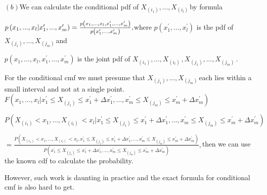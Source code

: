 \documentclass{article}
\begin{document}
$\left( b\right) $We can calculate the conditional pdf of $X_{\left(
i_{1}\right) },...,X_{\left( i_{l}\right) \ }$by formula

$p\left( x_{1},...,x_{l}|x_{1}^{\prime },...,x_{m}^{\prime }\right) =\frac{%
p\left( x_{1},...,x_{l},x_{1}^{\prime },...,x_{m}^{\prime }\right) }{p\left(
x_{1}^{\prime },...,x_{m}^{\prime }\right) },$where $p\left( x_{1}^{\prime
},...,x_{l}^{\prime }\right) $ is the pdf of $X_{\left( j_{1}\right)
},...,X_{\left( j_{m}\right) \ }$and

$p\left( x_{1},...,x_{l},x_{1}^{\prime },...,x_{m}^{\prime }\right) $ is the
joint pdf of $X_{\left( i_{1}\right) },...,X_{\left( i_{l}\right) \
},X_{\left( j_{1}\right) },...,X_{\left( j_{m}\right) \ }.$

For the conditional cmf we must presume that $X_{\left( j_{1}\right)
},...,X_{\left( j_{m}\right) \ }$each lies within a small interval and not
at a single point. $F\left( x_{1},...,x_{l}|x_{1}^{\prime }\leq X_{\left(
j_{1}\right) }\leq x_{1}^{\prime }+\Delta x_{1}^{\prime },...,x_{m}^{\prime
}\leq X_{\left( j_{m}\right) }\leq x_{m}^{\prime }+\Delta x_{m}^{\prime
}\right) $

$P\left( X_{\left( i_{1}\right) }<x_{1},...,X_{\left( i_{l}\right) \
}<x_{l}|x_{1}^{\prime }\leq X_{\left( j_{1}\right) }\leq x_{1}^{\prime
}+\Delta x_{1}^{\prime },...,x_{m}^{\prime }\leq X_{\left( j_{m}\right)
}\leq x_{m}^{\prime }+\Delta x_{m}^{\prime }\right) $

$=\frac{P\left( X_{\left( i_{1}\right) }<x_{1},...,X_{\left( i_{l}\right) \
}<x_{l},x_{1}^{\prime }\leq X_{\left( j_{1}\right) }\leq x_{1}^{\prime
}+\Delta x_{1}^{\prime },...,x_{m}^{\prime }\leq X_{\left( j_{m}\right)
}\leq x_{m}^{\prime }+\Delta x_{m}^{\prime }\right) }{P\left( x_{1}^{\prime
}\leq X_{\left( j_{1}\right) }\leq x_{1}^{\prime }+\Delta x_{1}^{\prime
},...,x_{m}^{\prime }\leq X_{\left( j_{m}\right) }\leq x_{m}^{\prime
}+\Delta x_{m}^{\prime }\right) },$then we can use the known cdf to
calculate the probability.

However, such work is daunting in practice and the exact formula for
conditional cmf is also hard to get.

\bigskip 
\end{document}
